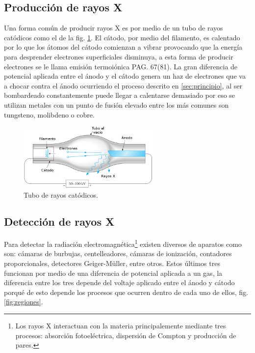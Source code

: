 \documentclass[letterpaper,10pt,twocolumn]{article}
\numberwithin{equation}{section}
\begin{document}
\subsection{Producción de rayos X}
\label{sec:produccion}

Una forma común de producir rayos X es por medio de un tubo de rayos catódicos como el de la
fig. \ref{fig:tubo}. El cátodo, por medio del filamento, es calentado por lo que los átomos
del cátodo comienzan a vibrar provocando que la energía para desprender electrones
superficiales disminuya, a esta forma de producir electrones se le llama emisión
termoiónica\cite{beisser} PAG. 67(81). La gran diferencia de potencial aplicada entre el
ánodo y el cátodo genera un haz de electrones que va a chocar contra el ánodo ocurriendo el
proceso descrito en \ref{sec:principio}, al ser bombardeado constantemente puede llegar
a calentarse demasiado por eso se utilizan metales con un punto de fusión elevado entre los 
más comunes son tungsteno, molibdeno o cobre.\cite{beisser}

\begin{figure}[H]
  \centering
  \includegraphics[width=7cm]{tubo}
  \caption{Tubo de rayos catódicos.\cite{serway}}
  \label{fig:tubo}
\end{figure}

\subsection{Detección de rayos X}
\label{sec:deteccion}

Para detectar la radiación electromagnética\footnote{Los rayos X interactuan con la materia
  principalemente mediante tres procesos: absorción fotoeléctrica, dispersión de Compton y
  producción de pares.\cite{krane}} existen diversos de aparatos como son: cámaras 
de burbujas, centelleadores, cámaras de ionización, contadores proporcionales, detectores
Geiger-Müller, entre otros. Estos últimos tres funcionan por medio de una diferencia de
potencial aplicada a un gas, la diferencia entre los tres depende del voltaje aplicado entre
el ánodo y cátodo porqué de esto depende los procesos que ocurren dentro de cada uno de
ellos, fig. \ref{fig:regiones}.
\end{document}
